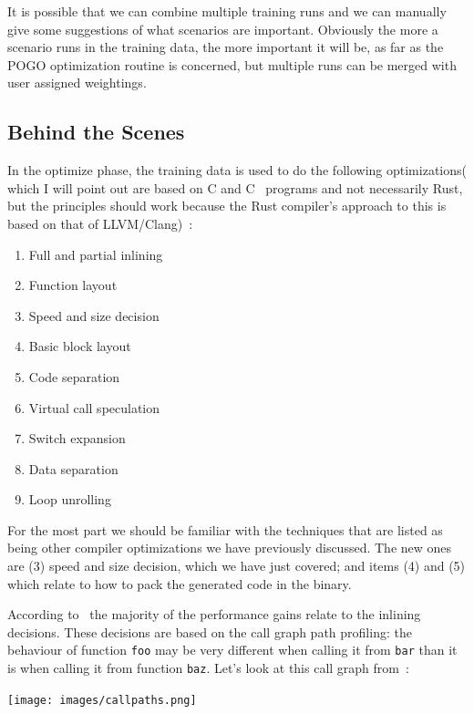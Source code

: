 \documentclass[a4paper]{report}
\newcommand{\CPP}{C\nolinebreak\hspace{-.05em}\raisebox{.4ex}{\tiny\bf +}\nolinebreak\hspace{-.10em}\raisebox{.4ex}{\tiny\bf +}}
\def\CPP{{C\nolinebreak[4]\hspace{-.05em}\raisebox{.4ex}{\tiny\bf ++}}}
\begin{document}
It is possible that we can combine multiple training runs and we can manually give some suggestions of what scenarios are important. Obviously the more a scenario runs in the training data, the more important it will be, as far as the POGO optimization routine is concerned, but multiple runs can be merged with user assigned weightings.

\subsection*{Behind the Scenes}

In the optimize phase, the training data is used to do the following optimizations( which I will point out are based on C and \CPP~ programs and not necessarily Rust, but the principles should work because the Rust compiler's approach to this is based on that of LLVM/Clang)~\cite{pogo2}:

\begin{multicols}{2}
\begin{enumerate}
\item Full and partial inlining
\item Function layout
\item Speed and size decision
\item Basic block layout 
\item Code separation
\item Virtual call speculation
\item Switch expansion
\item Data separation
\item Loop unrolling
\end{enumerate}
\end{multicols}

For the most part we should be familiar with the techniques that are listed as being other compiler optimizations we have previously discussed. The new ones are (3) speed and size decision, which we have just covered; and items (4) and (5) which relate to how to pack the generated code in the binary.

According to~\cite{pogo2} the majority of the performance gains relate to the inlining decisions. These decisions are based on the call graph path profiling: the behaviour of function \texttt{foo} may be very different when calling it from \texttt{bar} than it is when calling it from function \texttt{baz}. Let's look at this call graph from~\cite{pogo2}:

\begin{center}
	\texttt{[image: images/callpaths.png]}
\end{center}
\end{document}
